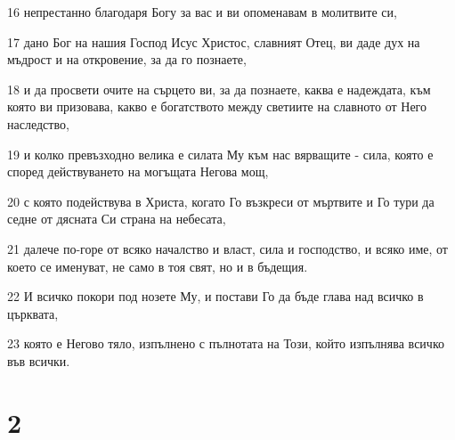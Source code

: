 \par 16 непрестанно благодаря Богу за вас и ви опоменавам в молитвите си,
\par 17 дано Бог на нашия Господ Исус Христос, славният Отец, ви даде дух на мъдрост и на откровение, за да го познаете,
\par 18 и да просвети очите на сърцето ви, за да познаете, каква е надеждата, към която ви призовава, какво е богатството между светиите на славното от Него наследство,
\par 19 и колко превъзходно велика е силата Му към нас вярващите - сила, която е според действуването на могъщата Негова мощ,
\par 20 с която подействува в Христа, когато Го възкреси от мъртвите и Го тури да седне от дясната Си страна на небесата,
\par 21 далече по-горе от всяко началство и власт, сила и господство, и всяко име, от което се именуват, не само в тоя свят, но и в бъдещия.
\par 22 И всичко покори под нозете Му, и постави Го да бъде глава над всичко в църквата,
\par 23 която е Негово тяло, изпълнено с пълнотата на Този, който изпълнява всичко във всички.

\chapter{2}

